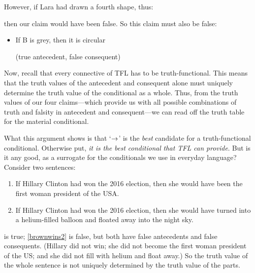 However, if Lara had drawn a fourth shape, thus:
\begin{center}
\end{center}
then our claim would have been false. So this claim must also be false:
	\begin{itemize}
		\item If B is grey, then it is circular

		\qquad (true antecedent, false consequent)
	\end{itemize}
Now, recall that every connective of TFL has to be truth-functional. This means that the truth values of the antecedent and consequent alone must uniquely determine the truth value of the conditional as a whole. Thus, from the truth values of our four claims---which provide us with all possible combinations of truth and falsity in antecedent and consequent---we can read off the truth table for the material conditional.

What this argument shows is that `$\rightarrow$' is the \emph{best} candidate for a truth-functional conditional. Otherwise put, \emph{it is the best conditional that TFL can provide}. But is it any good, as a surrogate for the conditionals we use in everyday language? Consider two sentences:
	\begin{enumerate}
		\item\label{brownwins1} If Hillary Clinton had won the 2016 election, then she would have been the first woman president of the USA.
		\item\label{brownwins2} If Hillary Clinton had won the 2016 election, then she would have turned into a helium-filled balloon and floated away into the night sky.
	\end{enumerate}
 is true; \cref*{brownwins2} is false, but both have false antecedents and false consequents. (Hillary did not win; she did not become the first woman president of the US; and she did not fill with helium and float away.) So the truth value of the whole sentence is not uniquely determined by the truth value of the parts.

